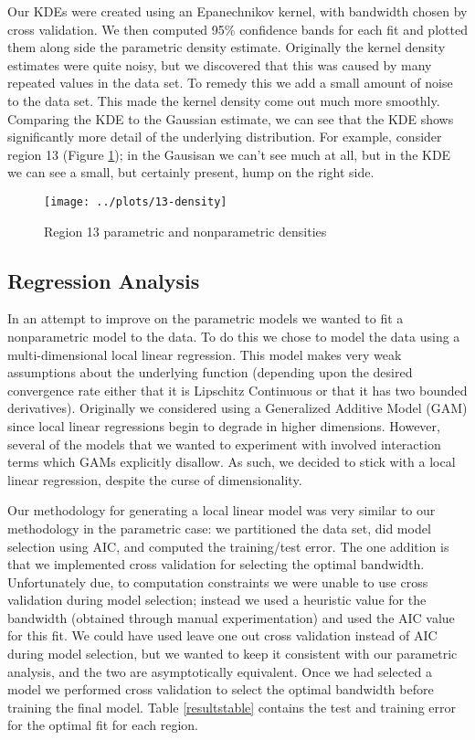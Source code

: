 \documentclass[12pt]{article}
\begin{document}
Our KDEs were created using an Epanechnikov kernel, with bandwidth chosen by cross validation. We then computed 95\% confidence bands for each fit and plotted them along side the parametric density estimate. Originally the kernel density estimates were quite noisy, but we discovered that this was caused by many repeated values in the data set. To remedy this we add a small amount of noise to the data set. This made the kernel density come out much more smoothly. Comparing the KDE to the Gaussian estimate, we can see that the KDE shows significantly more detail of the underlying distribution. For example, consider region 13 (Figure \ref{region13density}); in the Gausisan we can't see much at all, but in the KDE we can see a small, but certainly present, hump on the right side.
\begin{figure}[!ht]
\centering
\texttt{[image: ../plots/13-density]}
\caption{Region 13 parametric and nonparametric densities}
\label{region13density}
\end{figure}
\subsection{Regression Analysis}
In an attempt to improve on the parametric models we wanted to fit a nonparametric model to the data. To do this we chose to model the data using a multi-dimensional local linear regression. This model makes very weak assumptions about the underlying function (depending upon the desired convergence rate either that it is Lipschitz Continuous or that it has two bounded derivatives). Originally we considered using a Generalized Additive Model (GAM) since local linear regressions begin to degrade in higher dimensions. However, several of the models that we wanted to experiment with involved interaction terms which GAMs explicitly disallow. As such, we decided to stick with a local linear regression, despite the curse of dimensionality.

Our methodology for generating a local linear model was very similar to our methodology in the parametric case: we partitioned the data set, did model selection using AIC, and computed the training/test error. The one addition is that we implemented cross validation for selecting the optimal bandwidth. Unfortunately due, to computation constraints we were unable to use cross validation during model selection; instead we used a heuristic value for the bandwidth (obtained through manual experimentation) and used the AIC value for this fit. We could have used leave one out cross validation instead of AIC during model selection, but we wanted to keep it consistent with our parametric analysis, and the two are asymptotically equivalent. Once we had selected a model we performed cross validation to select the optimal bandwidth before training the final model. Table \ref{resultstable} contains the test and training error for the optimal fit for each region. 
\end{document}
